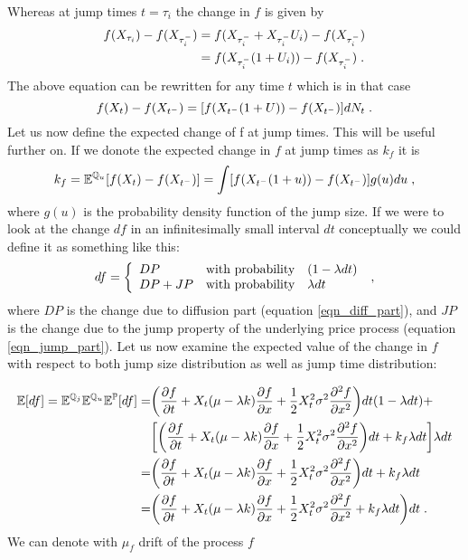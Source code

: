 \documentclass[times, utf8, diplomski]{fer}
\begin{document}
\noindent Whereas at jump times $t = \tau_i$ the change in $f$ is given by 
\begin{equation}
\begin{split}
	f(X_{\tau_i}) - f(X_{\tau_i^-}) &= f(X_{\tau_i^-} + X_{\tau_i^-}U_i) - f(X_{\tau_i^-}) \\
	   &= f(X_{\tau_i^-}(1+U_i)) - f(X_{\tau_i^-}) \hspace{0.1cm}.
\end{split}
\end{equation}
The above equation can be rewritten for any time $t$ which is in that case
\begin{equation} \label{eqn_jump_part}
	f(X_t) - f(X_{t^-}) = [f(X_{t^-}(1 + U)) - f(X_{t^-})]dN_t \hspace{0.1cm}.
\end{equation}
Let us now define the expected change of f at jump times. This will be useful further on. If we donote the expected change in $f$ at jump times as $k_f$ it is
\begin{equation}
	k_f = \mathbb{E}^{\mathbb{Q}_u}[f(X_t) - f(X_{t^-})] = \int[f(X_{t^-}(1 + u)) - f(X_{t^-})]g(u)du \hspace{0.1cm},
\end{equation} where $g(u)$ is the probability density function of the jump size.
If we were to look at the change $df$ in an infinitesimally small interval $dt$ conceptually we could define it as something like this:
$$
	df = \left\{  \begin{array}{lcl} DP & \mbox{with probability} & (1 - \lambda dt) \\
			  DP + JP & \mbox{with probability} & \lambda dt \end{array} \right.  \hspace{0.1cm},
$$ where $DP$ is the change due to diffusion part (equation \ref{eqn_diff_part}), and $JP$ is the change due to the jump property of the underlying price process (equation \ref{eqn_jump_part}). Let us now examine the expected value of the change in $f$ with respect to both jump size distribution as well as jump time distribution:

\begin{align*}
\mathbb{E}[df] = \mathbb{E}^{\mathbb{Q}_j}\mathbb{E}^{\mathbb{Q}_u}\mathbb{E}^{\mathbb{P}}[df] =& \bigg(\frac{\partial f}{\partial t} + X_t(\mu - \lambda k)\frac{\partial f}{\partial x} + \frac{1}{2}X_t^2\sigma^2\frac{\partial^2 f}{\partial x^2}\bigg)dt(1-\lambda dt) + \\
& \bigg[\bigg(\frac{\partial f}{\partial t} + X_t(\mu - \lambda k)\frac{\partial f}{\partial x} + \frac{1}{2}X_t^2\sigma^2\frac{\partial^2 f}{\partial x^2}\bigg)dt + k_f \lambda dt \bigg]\lambda dt \\
=& \bigg(\frac{\partial f}{\partial t} + X_t(\mu - \lambda k)\frac{\partial f}{\partial x} + \frac{1}{2}X_t^2\sigma^2\frac{\partial^2 f}{\partial x^2}\bigg)dt + k_f \lambda dt \\
=& \bigg(\frac{\partial f}{\partial t} + X_t(\mu - \lambda k)\frac{\partial f}{\partial x} + \frac{1}{2}X_t^2\sigma^2\frac{\partial^2 f}{\partial x^2} + k_f \lambda dt\bigg)dt \hspace{0.1cm}.
\end{align*}
We can denote with $\mu_f$ drift of the process $f$
\end{document}
